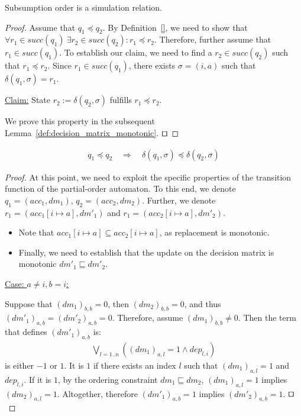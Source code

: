\documentclass[envcountsame]{llncs}%
\begin{document}
\begin{theorem}
  Subsumption order is a simulation relation.
\end{theorem}

\begin{proof}
Assume that $q_1 \preceq q_2$. 
By Definition~\ref{}, we need to show that 
\mbox{$\forall r_1\in succ(q_1)\ \exists r_2\in succ(q_2): r_1 \preceq r_2$}.
Therefore, further assume that \mbox{$r_1\in succ(q_1)$}.
To establish our claim, we need to find a $r_2\in succ(q_2)$ such that $r_1 \preceq r_2$.
Since $r_1\in succ(q_1)$, there exists $\sigma=(i,a)$ such that $\delta(q_1,\sigma)=r_1$.

\underline{Claim:} State $r_2 := \delta(q_2,\sigma)$ fulfills $r_1 \preceq r_2$.

We prove this property in the subsequent Lemma~\ref{def:decision_matrix_monotonic}.
$\qed$
\end{proof}

\begin{lemma}
\begin{align*}
q_1 \preceq q_2\quad \Longrightarrow \quad \delta(q_1,\sigma) \preceq \delta(q_2,\sigma)
\end{align*}

\label{def:decision_matrix_monotonic}
\end{lemma}

\begin{proof}
  At this point, we need to exploit the specific properties of the transition
  function of the partial-order automaton. To this end,
  we denote $q_1=(acc_1,dm_1)$, $q_2=(acc_2, dm_2)$.
  Further, we denote \mbox{$r_1=(acc_1[i\mapsto a], dm'_1)$} and \mbox{$r_1=(acc_2[i\mapsto a], dm'_2)$}.

  \begin{itemize}
    \item Note that $acc_1[i\mapsto a] \subseteq acc_2[i\mapsto a]$, as replacement is monotonic.
    \item Finally, we need to establish that the update on the decision matrix is monotonic $dm'_1 \sqsubseteq dm'_2$.
  \end{itemize}


\underline{Case: $a\neq i, b=i$:}

  Suppose that $(dm_1)_{b,b}=0$, then $(dm_2)_{b,b}=0$, and thus $(dm'_1)_{a,b}=(dm'_2)_{a,b}=0$.
  Therefore, assume $(dm_1)_{b,b}\neq 0$.
  Then the term that defines $(dm'_1)_{a,b}$ is:
  \begin{align*}
  \bigvee_{l=1..n} \left ({(dm_1)}_{a,l}=1 \wedge {dep}_{l,i} \right)
  \end{align*}
  is either $-1$ or $1$.
  It is $1$ if there exists an index $l$ such that ${(dm_1)}_{a,l}=1$ and ${dep}_{l,i}$.
  If it is $1$, by the ordering constraint $dm_1 \sqsubseteq dm_2$, ${(dm_1)}_{a,l}=1$ implies
  ${(dm_2)}_{a,l}=1$. Altogether, therefore ${(dm'_1)}_{a,b}=1$ implies ${(dm'_2)}_{a,b}=1$.
$\qed$
\end{proof}
\end{document}
